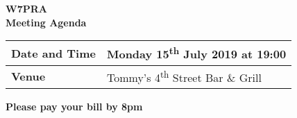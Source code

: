 \documentclass[letter,11pt]{extarticle}
\begin{document}
	\thispagestyle{empty}
	
	\begin{center}
		\textbf{W7PRA\\Meeting Agenda}
		\vspace{0.33cm}
	\end{center}
	
	\begin{center}
		\begin{tabular}{| m{3.0cm} | m{7.5cm} |} \hline
			\textbf{Date and Time} & Monday 15\textsuperscript{th} July 2019 at 19:00 \\ \hline
			\textbf{Venue} & Tommy's 4\textsuperscript{th} Street Bar \& Grill \\ \hline
				\end{tabular}
	\end{center}
	
	\begin{center}
		\textbf{Please pay your bill by 8pm}
	\end{center}
	
\end{document}

